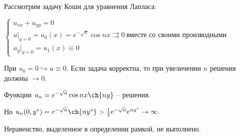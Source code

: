 \documentclass[../main.tex]{subfiles}
\begin{document}
\begin{example}[Адамара]
Рассмотрим задачу Коши для уравнения Лапласа:

$\begin{cases} u_{xx}+u_{yy} = 0 \\
u|_{y=0} = u_0(x) = e^{-\sqrt{n}}\cos{nx} \rightrightarrows 0\ \text{вместе со своими производными} \\
u_y|_{y=0} = u_1(x) \equiv 0
\end{cases}$

При $u_0 = 0 \hookrightarrow u\equiv 0$. Если задача корректна, то при увеличении $n$ решения должны $\rightarrow 0$. 

Функции $u_n=e^{-\sqrt{n}}\cos{nx}\ch{ny}$ -- решения.

Но $u_n(0, y^*) = e^{-\sqrt{n}}\ch{ny^*} > \frac1{2}e^{-\sqrt{n}}e^{ny^*} \rightarrow \infty$

Неравенство, выделенное в определении рамкой, не выполнено.
\end{example}
\end{document}

